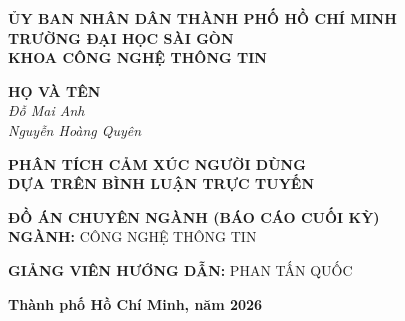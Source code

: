 \thispagestyle{empty}


\vspace*{2.5cm}

\begin{center}
{\fontsize{14}{16}\selectfont \textbf{ỦY BAN NHÂN DÂN THÀNH PHỐ HỒ CHÍ MINH}}\\[0.4cm]

{\fontsize{14}{16}\selectfont \textbf{TRƯỜNG ĐẠI HỌC SÀI GÒN}}\\[0.4cm]

{\fontsize{14}{16}\selectfont \textbf{KHOA CÔNG NGHỆ THÔNG TIN}}

\vspace{1.5cm}

{\fontsize{14}{16}\selectfont \textbf{HỌ VÀ TÊN}}\\[0.4cm]

{\fontsize{14}{16}\selectfont \itshape Đỗ Mai Anh}\\[0.3cm]

{\fontsize{14}{16}\selectfont \itshape Nguyễn Hoàng Quyên}

\vspace{1.5cm}

{\fontsize{14}{16}\selectfont \textbf{PHÂN TÍCH CẢM XÚC NGƯỜI DÙNG}}\\[0.4cm]

{\fontsize{14}{16}\selectfont \textbf{DỰA TRÊN BÌNH LUẬN TRỰC TUYẾN}}

\vspace{1.5cm}

{\fontsize{14}{16}\selectfont \textbf{ĐỒ ÁN CHUYÊN NGÀNH (BÁO CÁO CUỐI KỲ)}}\\[0.4cm]

{\fontsize{14}{16}\selectfont \textbf{NGÀNH:} CÔNG NGHỆ THÔNG TIN}

\vspace{1.5cm}

{\fontsize{14}{16}\selectfont \textbf{GIẢNG VIÊN HƯỚNG DẪN:} PHAN TẤN QUỐC}

\vfill

{\fontsize{14}{16}\selectfont \textbf{Thành phố Hồ Chí Minh, năm 2026}}

\end{center}

\clearpage
